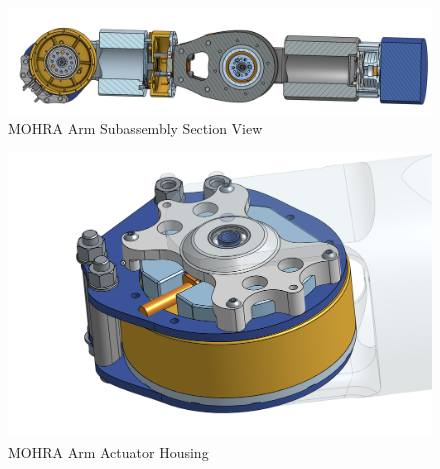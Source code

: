 \documentclass{article}
\begin{document}
\begin{figure}[H]
    \centering
    \includegraphics[scale=0.4]{assets/Design Presentation/MOHRA_arm_section.png}
    \caption{MOHRA Arm Subassembly Section View}
    \label{fig:enter-label}
\end{figure}

\begin{figure}[H]
    \centering
    \includegraphics[scale=0.6]{assets/Design Presentation/MOHRA_Arm_housing.png}
    \caption{MOHRA Arm Actuator Housing}
    \label{fig:enter-label}
\end{figure}
\end{document}
